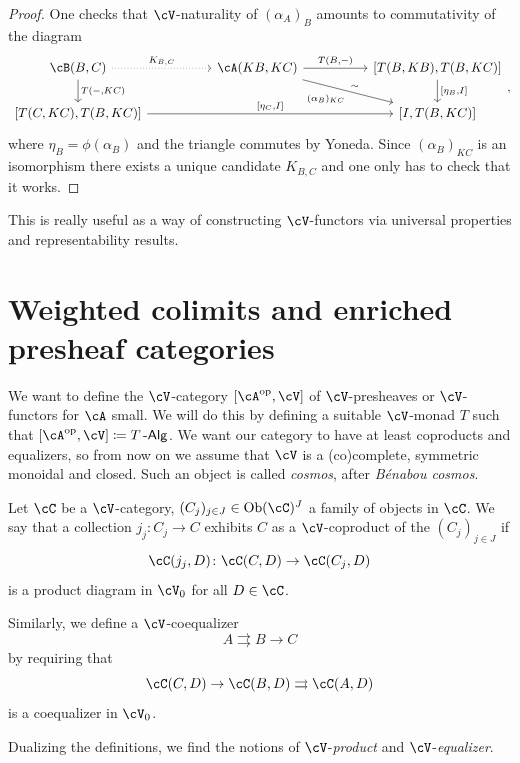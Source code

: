 \documentclass[a4paper,11pt,oneside,openany]{scrbook}
\begin{document}
\begin{proof}
	One checks that $\cV$-naturality of $(\alpha_A)_B$ amounts to commutativity of the diagram
	\[
		\begin{tikzcd}[column sep = 5em]
			\cB(B,C)\ar[r, dotted, "K_{B,C}"]\ar[d, "{T(-,KC)}"]
			& \cA(KB,KC)\ar[r, "{T(B,-)}"]\ar[dr, "\sim"', swap, "{(\alpha_B)_{KC}}"]
			& {[T(B,KB),T(B,KC)]}\ar[d, "{[\eta_B, I]}"] \\
			{[T(C,KC),T(B,KC)]}\ar[rr, "{[\eta_C,I]}"]
			&& {[I,T(B,KC)]}
		\end{tikzcd}
		,\]
	where $\eta_B=\phi(\alpha_B)$ and the triangle commutes by Yoneda. Since $(\alpha_B)_{KC}$ is an isomorphism there exists a unique candidate $K_{B,C}$ and one only has to check that it works.
\end{proof}

\begin{rmk}
	This is really useful as a way of constructing $\cV$-functors via universal properties and representability results.
\end{rmk}

\section{Weighted colimits and enriched presheaf categories}

We want to define the $\cV$-category $[\cA^{\op},\cV]$ of $\cV$-presheaves or
$\cV$-functors for $\cA$ small. We will do this by defining a suitable
$\cV$-monad $T$ such that $[\cA^{\op},\cV]\coloneqq T\Alg$. We want our category
to have at least coproducts and equalizers, so from now on we assume that $\cV$
is a (co)complete, symmetric monoidal and closed. Such an object is called
\emph{cosmos}, after \emph{B\'enabou cosmos}.

\begin{defn}
	Let $\cC$ be a $\cV$-category, $(C_j)_{j\in J}\in\Ob(\cC)^J$ a family of
    objects in $\cC$. We say that a collection $j_j\colon C_j\rightarrow C$
    exhibits $C$ as a $\cV$-coproduct of the $(C_j)_{j\in J}$
    if$$\cC(j_j,D)\colon\cC(C,D)\rightarrow\cC(C_j,D)$$is a product diagram in
    $\cV_0$ for all $D\in\cC$.

	Similarly, we define a $\cV$-coequalizer$$A\rightrightarrows B\rightarrow
    C$$ by requiring that
    $$\cC(C,D)\rightarrow\cC(B,D)\rightrightarrows\cC(A,D)$$is a coequalizer in
    $\cV_0$.

	Dualizing the definitions, we find the notions of $\cV$-\emph{product} and
    $\cV$-\emph{equalizer}.
\end{defn}
\end{document}
